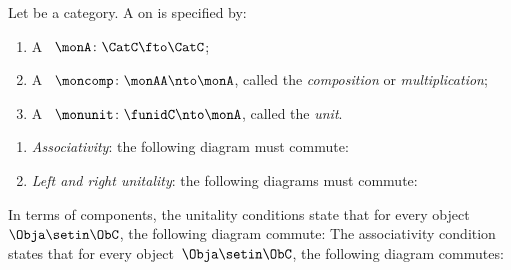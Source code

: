 \begin{ctdefinition}[Monad]
    \label{def:monad}
    Let \CatC be a category.
    A  on \CatC is specified by:\\
    \constit
    \begin{enumerate}
        \item A ~$ \monA \colon \CatC \fto \CatC$;
        \item A ~$\moncomp \colon \monAA \nto \monA$, called the \emph{composition} or \emph{multiplication};
        \item A ~$\monunit \colon \funidC \nto \monA$, called the \emph{unit}.
    \end{enumerate}
    \condit
    \begin{enumerate}
        \item \emph{Associativity}: the following diagram must commute:
        \item \emph{Left and right unitality}: the following diagrams must commute:
    \end{enumerate}
\end{ctdefinition}

\begin{remark}
    \label{rem:monad-condition-components}
    In terms of components, the unitality conditions state that for every object~$\Obja \setin \ObC$, the following diagram commute:
    The associativity condition states that for every object~$\Obja \setin \ObC$,
    the following diagram commutes:
\end{remark}



